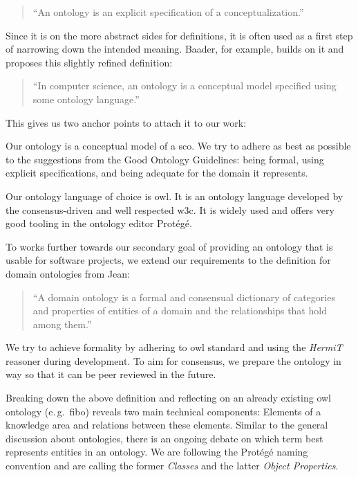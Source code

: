 \documentclass[a4paper, DIV=13, BCOR=0cm]{scrbook}
\newcommand{\eg}{e.\,g.\ }
\begin{document}
\begin{quote}
	\enquote{An ontology is an explicit specification of a conceptualization.} \cite[p.\, 1]{gruber1993translation}
\end{quote}

Since it is on the more abstract sides for definitions, it is often used as a first step of narrowing down the intended meaning. Baader, for example, builds on it and proposes this slightly refined definition:

\begin{quote}
	\enquote{In computer science, an ontology is a conceptual model specified using some ontology language.} \cite[p.\,205]{baader2017introduction}
\end{quote}

This gives us two anchor points to attach it to our work:
\begin{inparaenum}
	\item Our ontology is a conceptual model of a \gls{sco}. We try to adhere as best as possible to the suggestions from the Good Ontology Guidelines: being formal, using explicit specifications, and being adequate for the domain it represents. \cite[p.\,10]{schulz2012guideline}
	\item Our ontology language of choice is \gls{owl}. It is an ontology language developed by the consensus-driven and well respected \gls{w3c}. \cite[p.\,206]{baader2017introduction} It is widely used and offers very good tooling in the ontology editor Protégé.
\end{inparaenum}



To works further towards our secondary goal of providing an ontology that is usable for software projects, we extend our requirements to the definition for domain ontologies from Jean: 

\begin{quote}
	\enquote{A domain ontology is a formal and consensual dictionary of categories and properties of entities of a domain and the relationships that hold among them.} \cite[p.\,240]{Jean_2007}
\end{quote}

We try to achieve formality by adhering to \gls{owl} standard and using the \textit{HermiT} reasoner during development. To aim for consensus, we prepare the ontology in way so that it can be peer reviewed in the future.

Breaking down the above definition and reflecting on an already existing \gls{owl} ontology (\eg \gls{fibo}) reveals two main technical components: Elements of a knowledge area and relations between these elements.  Similar to the general discussion about ontologies, there is an ongoing debate on which term best represents entities in an ontology. We are following the Protégé naming convention and are calling the former \textit{Classes} and the latter \textit{Object Properties}.
\end{document}
